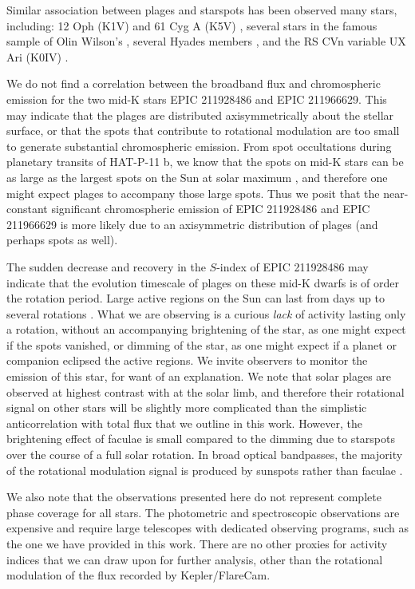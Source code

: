 Similar association between plages and starspots has been observed many stars, including: 12 Oph (K1V) and 61 Cyg A (K5V) \citep{Dorren1982}, several stars in the famous sample of Olin Wilson's \citep{Radick1983}, several Hyades members \citep{Lockwood1984}, and the RS CVn variable UX Ari (K0IV) \citep{Gu2005}. 

We do not find a correlation between the broadband flux and chromospheric emission for the two mid-K stars EPIC 211928486 and EPIC 211966629. This may indicate that the plages are distributed axisymmetrically about the stellar surface, or that the spots that contribute to rotational modulation are too small to generate substantial chromospheric emission. From spot occultations during planetary transits of HAT-P-11 b, we know that the spots on mid-K stars can be as large as the largest spots on the Sun at solar maximum \citep{Morris2017a, Morris2018d}, and therefore one might expect plages to accompany those large spots. Thus we posit that the near-constant significant chromospheric emission of EPIC 211928486 and EPIC 211966629 is more likely due to an axisymmetric distribution of plages (and perhaps spots as well).  

The sudden decrease and recovery in the $S$-index of EPIC 211928486 may indicate that the evolution timescale of plages on these mid-K dwarfs is of order the rotation period. Large active regions on the Sun can last from days up to several rotations \citep{Solanki2003}. What we are observing is a curious \textit{lack} of activity lasting only a rotation, without an accompanying brightening of the star, as one might expect if the spots vanished, or dimming of the star, as one might expect if a planet or companion eclipsed the active regions. We invite observers to monitor the  emission of this star, for want of an explanation. 
We note that solar plages are observed at highest contrast with at the solar limb, and therefore their rotational signal on other stars will be slightly more complicated than the simplistic anticorrelation with total flux that we outline in this work. However, the brightening effect of faculae is small compared to the dimming due to starspots over the course of a full solar rotation. In broad optical bandpasses, the majority of the rotational modulation signal is produced by sunspots rather than faculae \citep{Shapiro2016}.

We also note that the observations presented here do not represent complete phase coverage for all stars. The photometric and spectroscopic observations are expensive and require large telescopes with dedicated observing programs, such as the one we have provided in this work. There are no other proxies for activity indices that we can draw upon for further analysis, other than the rotational modulation of the flux recorded by Kepler/FlareCam. 


